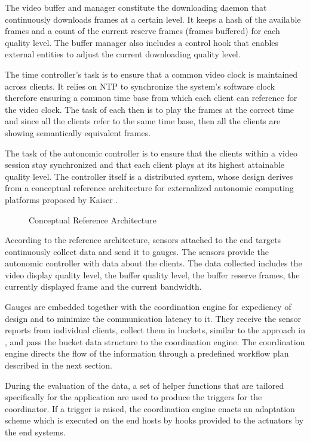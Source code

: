 \documentclass{sig-alternate}
\begin{document}
The video buffer and manager constitute the downloading daemon that
continuously downloads frames at a certain level.  It keeps a hash of
the available frames and a count of the current reserve frames (frames
buffered) for each quality level.  The buffer manager also includes a
control hook that enables external entities to adjust the current
downloading quality level.

The time controller's task is to ensure that a common video clock is
maintained across clients.  It relies on NTP \cite{NTP} to synchronize
the system's software clock therefore ensuring a common time base from
which each client can reference for the video clock.  The task of each
then is to play the frames at the correct time and since all the
clients refer to the same time base, then all the clients are showing
semantically equivalent frames.

The task of the autonomic controller is to ensure that the clients
within a video session stay synchronized and that each client plays at
its highest attainable quality level.  The controller itself is a
distributed system, whose design derives from a conceptual reference
architecture for externalized autonomic computing platforms proposed
by Kaiser \cite{REFARCH}.
%
%

\begin{figure}
 \centering
  \label{refarch}
 \caption{Conceptual Reference Architecture}
\end{figure}


According to the reference architecture, sensors attached to the end
targets continuously collect data and send it to gauges.  The sensors
provide the autonomic controller with data about the clients.  The
data collected includes the video display quality level, the buffer
quality level, the buffer reserve frames, the currently displayed
frame and the current bandwidth.

Gauges are embedded together with the coordination engine for
expediency of design and to minimize the communication latency to it.
They receive the sensor reports from individual clients, collect them
in buckets, similar to the approach in \cite{MIMAZE}, and pass the
bucket data structure to the coordination engine.  The coordination
engine directs the flow of the information through a predefined
workflow plan described in the next section.

During the evaluation of the data, a set of helper functions that are
tailored specifically for the application are used to produce the
triggers for the coordinator.  If a trigger is raised, the
coordination engine enacts an adaptation scheme which is executed on
the end hosts by hooks provided to the actuators by the end systems.
\end{document}
